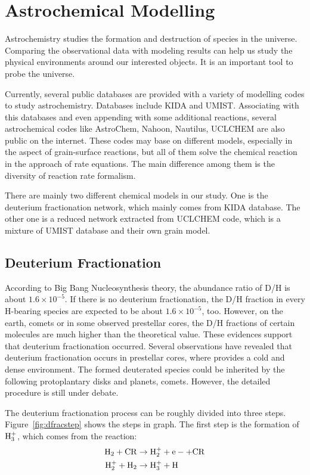 \chapter{Astrochemical Modelling\label{ch:astrochemistry}}

Astrochemistry studies the formation and destruction of species in the universe. Comparing the observational data with modeling results can help us study the physical environments around our interested objects. It is an important tool to probe the universe.

Currently, several public databases are provided with a variety of modelling codes to study astrochemistry. Databases include KIDA and UMIST. Associating with this databases and even appending with some additional reactions, several astrochemical codes like AstroChem, Nahoon, Nautilus, UCLCHEM are also public on the internet. These codes may base on different models, especially in the aspect of grain-surface reactions, but all of them solve the chemical reaction in the approach of rate equations. The main difference among them is the diversity of reaction rate formalism.

There are mainly two different chemical models in our study. One is the deuterium fractionation network, which mainly comes from KIDA database. The other one is a reduced network extracted from UCLCHEM code, which is a mixture of UMIST database and their own grain model.

\section{Deuterium Fractionation\label{sec:deufrac}}
According to Big Bang Nucleosynthesis theory, the abundance ratio of D/H is about $1.6 \times 10^{-5}$. If there is no deuterium fractionation, the D/H fraction in every H-bearing species are expected to be about $1.6 \times 10^{-5}$, too. However, on the earth, comets or in some observed prestellar cores, the D/H fractions of certain molecules are much higher than the theoretical value. These evidences support that deuterium fractionation occurred. Several observations have revealed that deuterium fractionation occurs in prestellar cores, where provides a cold and dense environment. The formed deuterated species could be inherited by the following protoplantary disks and planets, comets. However, the detailed procedure is still under debate.

The deuterium fractionation process can be roughly divided into three steps. Figure~\ref{fig:dfracstep} shows the steps in graph. The first step is the formation of $\rm H_3^+$, which comes from the reaction:
\begin{equation}
    \begin{split}
        \rm H_2   + CR  &\rightarrow \rm H_2^+ + e- + CR \\
        \rm H_2^+ + H_2 &\rightarrow \rm H_3^+ + H \\
    \end{split}
\end{equation}

